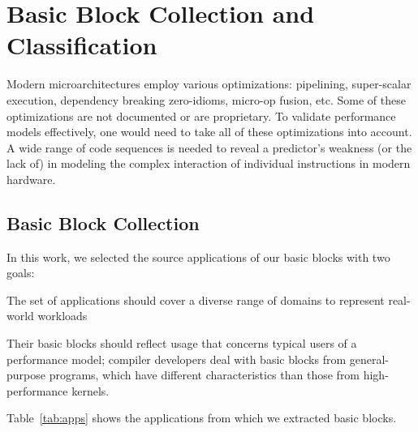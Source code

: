 \section{Basic Block Collection and Classification}
Modern microarchitectures employ various optimizations:
pipelining, super-scalar execution, dependency breaking zero-idioms, micro-op fusion, etc.
Some of these optimizations are not documented or are proprietary.
To validate performance models effectively, one would need to take
all of these optimizations into account.
A wide range of code sequences is needed to reveal a predictor's 
weakness (or the lack of) in modeling the complex interaction of 
individual instructions in modern hardware. 

\subsection{Basic Block Collection}
In this work, we selected the source applications of our basic blocks with two goals:
\begin{enumerate*}
    \item The set of applications should cover a diverse range
of domains to represent real-world workloads
    \item Their basic blocks should reflect usage that concerns typical users of a performance model;
    compiler developers deal with
    basic blocks from general-purpose programs,
    which have different characteristics
    than those from 
    high-performance kernels. 
\end{enumerate*}
Table~\ref{tab:apps} shows the applications from which we extracted basic blocks.

